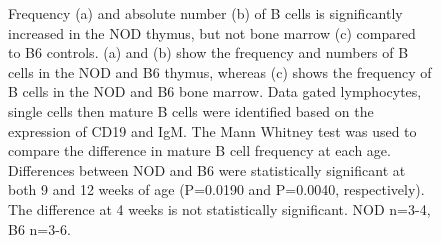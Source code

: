 \begin{figure}
\begin{subfigure}{0.5\textwidth}
	\caption{}
	\label{subfig:BMBcells}
	\end{subfigure}
\caption[NOD thymi have significantly more B cells than B6 thymi]{Frequency (a) and absolute number (b) of B cells is significantly increased in the NOD thymus, but not bone marrow (c) compared to B6 controls.
(a) and (b) show the frequency and numbers of B cells in the NOD and B6 thymus, whereas (c) shows the frequency of B cells in the NOD and B6 bone marrow.
Data gated lymphocytes, single cells then mature B cells were identified based on the expression of CD19 and IgM.
The Mann Whitney test was used to compare the difference in mature B cell frequency at each age. Differences between NOD and B6 were statistically significant at both 9 and 12 weeks of age (P=0.0190 and P=0.0040, respectively). The difference at 4 weeks is not statistically significant.
NOD n=3-4, B6 n=3-6.}
\label{fig:IncthyBcells}
\end{figure}

